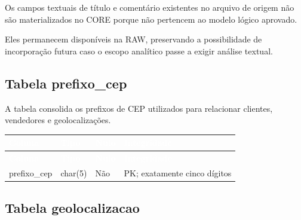 \documentclass[12pt,a4paper]{article}
\begin{document}
{{\begin{longtable}
			\end{longtable}
		}
		
	
	Os campos textuais de título e comentário existentes no arquivo de
	origem não são materializados no CORE porque não pertencem ao modelo
	lógico aprovado.
	
	Eles permanecem disponíveis na RAW, preservando a possibilidade de
	incorporação futura caso o escopo analítico passe a exigir análise
	textual.
	
	\subsection{Tabela prefixo\_cep}
	
	A tabela consolida os prefixos de CEP utilizados para relacionar
	clientes, vendedores e geolocalizações.
	
	{\small
		\renewcommand{\arraystretch}{1.2}
		
		\begin{longtable}{
				|>{\raggedright\arraybackslash}p{2.5cm}|
				>{\raggedright\arraybackslash}p{2cm}|
				>{\centering\arraybackslash}p{2cm}|
				>{\raggedright\arraybackslash}p{6cm}|
			}
			
			\hline
			
			\rowcolor{AzulCorporativo}
			
			\textcolor{white}{\textbf{Coluna}} &
			\textcolor{white}{\textbf{Tipo}} &
			\textcolor{white}{\textbf{Nulo}} &
			\textcolor{white}{\textbf{Integridade}}
			\\ \hline
			
			\endfirsthead
			
			\hline
			\rowcolor{AzulCorporativo}
			
			\textcolor{white}{\textbf{Coluna}} &
			\textcolor{white}{\textbf{Tipo}} &
			\textcolor{white}{\textbf{Nulo}} &
			\textcolor{white}{\textbf{Integridade}}
			\\ \hline
			
			\endhead
			
			prefixo\_cep
			&
			char(5)
			&
			Não
			&
			PK; exatamente cinco dígitos
			\\ \hline
			
		\end{longtable}
	}
	
	\subsection{Tabela geolocalizacao}
	
}
\end{document}
